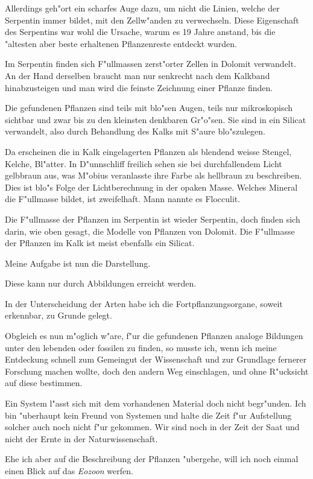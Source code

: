 \documentclass[a4paper, 11pt, oneside, german]{article}
\begin{document}
Allerdings geh"ort ein scharfes Auge dazu, um nicht die Linien, welche der Serpentin immer bildet, mit den Zellw"anden zu verwechseln. Diese Eigenschaft des Serpentins war wohl die Ursache, warum es 19 Jahre anstand, bis die "altesten aber beste erhaltenen Pflanzenreste entdeckt wurden.

Im Serpentin finden sich F"ullmassen zerst"orter Zellen in Dolomit verwandelt. An der Hand derselben braucht man nur senkrecht nach dem Kalkband hinabzusteigen und man wird die feinste Zeichnung einer Pflanze finden.

Die gefundenen Pflanzen sind teils mit blo"sen Augen, teils nur mikroskopisch sichtbar und zwar bis zu den kleinsten denkbaren Gr"o"sen. Sie sind in ein Silicat verwandelt, also durch Behandlung des Kalks mit S"aure blo"szulegen.

Da erscheinen die in Kalk eingelagerten Pflanzen als blendend weisse Stengel, Kelche, Bl"atter. In D"unnschliff freilich sehen sie bei durchfallendem Licht gelbbraun aus, was M"obius veranlasste ihre Farbe als hellbraun zu beschreiben. Dies ist blo"s Folge der Lichtberechnung in der opaken Masse. Welches Mineral die F"ullmasse bildet, ist zweifelhaft. Mann nannte es Flocculit.

Die F"ullmasse der Pflanzen im Serpentin ist wieder Serpentin, doch finden sich darin, wie oben gesagt, die Modelle von Pflanzen von Dolomit. Die F"ullmasse der Pflanzen im Kalk ist meist ebenfalls ein Silicat.

Meine Aufgabe ist nun die Darstellung.

Diese kann nur durch Abbildungen erreicht werden.

In der Unterscheidung der Arten habe ich die Fortpflanzungsorgane, soweit erkennbar, zu Grunde gelegt.

Obgleich es nun m"oglich w"are, f"ur die gefundenen Pflanzen analoge Bildungen unter den lebenden oder fossilen zu finden, so musste ich, wenn ich meine Entdeckung schnell zum Gemeingut der Wissenschaft und zur Grundlage fernerer Forschung machen wollte, doch den andern Weg einschlagen, und ohne R"ucksicht auf diese bestimmen.

Ein System l"asst sich mit dem vorhandenen Material doch nicht begr"unden. Ich bin "uberhaupt kein Freund von Systemen und halte die Zeit f"ur Aufstellung solcher auch noch nicht f"ur gekommen. Wir sind noch in der Zeit der Saat und nicht der Ernte in der Naturwissenschaft.

Ehe ich aber auf die Beschreibung der Pflanzen "ubergehe, will ich noch einmal einen Blick auf das \emph{Eozoon} werfen.
\clearpage
\end{document}
